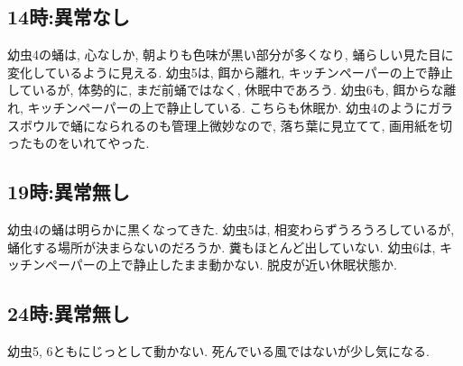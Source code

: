 \documentclass{jsarticle}
\begin{document}
\subsection{14時:異常なし}
幼虫4の蛹は, 心なしか, 朝よりも色味が黒い部分が多くなり, 蛹らしい見た目に変化しているように見える. 
幼虫5は, 餌から離れ, キッチンペーパーの上で静止しているが, 体勢的に, まだ前蛹ではなく, 休眠中であろう. 
幼虫6も, 餌からな離れ, キッチンペーパーの上で静止している. こちらも休眠か. 
幼虫4のようにガラスボウルで蛹になられるのも管理上微妙なので, 落ち葉に見立てて, 画用紙を切ったものをいれてやった. 

\subsection{19時:異常無し}
幼虫4の蛹は明らかに黒くなってきた. 
幼虫5は, 相変わらずうろうろしているが, 蛹化する場所が決まらないのだろうか. 糞もほとんど出していない. 
幼虫6は, キッチンペーパーの上で静止したまま動かない. 脱皮が近い休眠状態か. 

\subsection{24時:異常無し}
幼虫5, 6ともにじっとして動かない. 死んでいる風ではないが少し気になる. 
\end{document}
